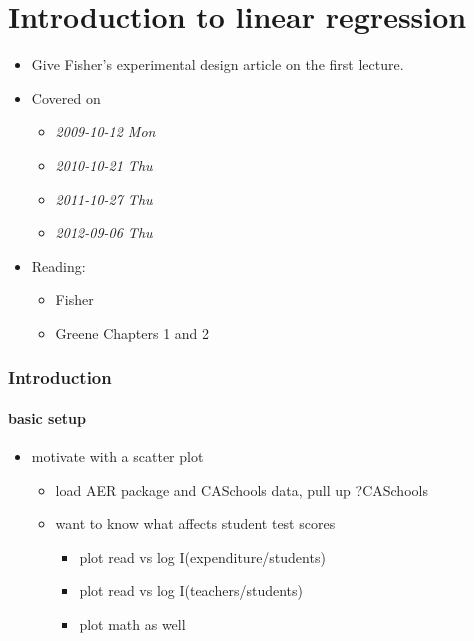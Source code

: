 
\part{Introduction to linear regression}

\begin{itemize}
\item Give Fisher's experimental design article on the first lecture.
\item Covered on
\begin{itemize}
\item \textit{2009-10-12 Mon}
\item \textit{2010-10-21 Thu}
\item \textit{2011-10-27 Thu}
\item \textit{2012-09-06 Thu}
\end{itemize}
\item Reading:
\begin{itemize}
\item Fisher
\item Greene Chapters 1 and 2
\end{itemize}
\end{itemize}
\section{Introduction}
\label{sec-1}
\subsection{basic setup}
\label{sec-1-1}

\begin{itemize}
\item motivate with a scatter plot
\begin{itemize}
\item load AER package and CASchools data, pull up ?CASchools
\item want to know what affects student test scores
\begin{itemize}
\item plot read vs log I(expenditure/students)
\item plot read vs log I(teachers/students)
\item plot math as well
\end{itemize}
\end{itemize}
\end{itemize}
